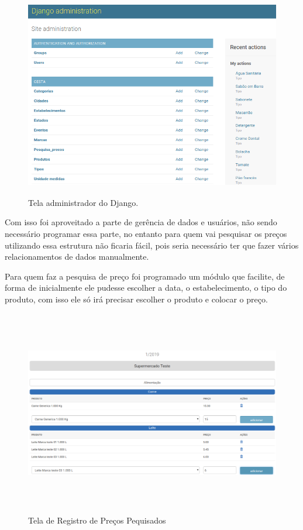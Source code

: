 \documentclass{ifto-tex}
\begin{document}
	\begin{figure}[H]
	\begin{center}
		\includegraphics[width=16.0cm, height= 9.0cm]{cestaadmin.png}    %
		\caption{Tela administrador do Django.} 
		\label{fig:faces}
	\end{center}
\end{figure}
Com isso foi aproveitado a parte de gerência de dados e usuários, não sendo necessário programar essa parte, no entanto para quem vai pesquisar os preços utilizando essa estrutura não ficaria fácil, pois seria necessário ter que fazer vários relacionamentos de dados manualmente.

Para quem faz a pesquisa de preço foi programado um módulo que facilite, de forma de inicialmente ele pudesse escolher a data, o estabelecimento, o tipo do produto, com isso ele só irá precisar escolher o produto e colocar o preço.

	\begin{figure}[H]
	\begin{center}
		\includegraphics[width=16.0cm, height= 9.0cm]{cestacadastro.png}    %
		\caption{Tela de Registro de Preços Pequisados} 
		\label{fig:faces}
	\end{center}
\end{figure}
\end{document}

